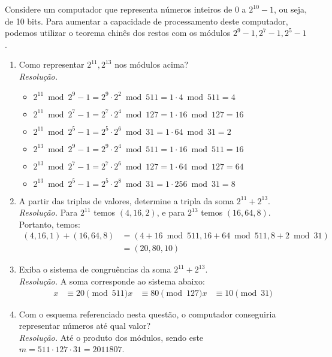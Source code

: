 Considere um computador que representa números inteiros de 0 a $2^{10} - 1$, ou seja, de 10 bits. Para aumentar a capacidade de processamento deste computador, podemos utilizar o teorema chinês dos restos com os módulos $2^{9} - 1, 2^{7} - 1, 2^{5} - 1$.
\begin{enumerate}
	\item Como representar $2^{11}, 2^{13}$ nos módulos acima? \\ 
	\emph{Resolução.} 
	\begin{itemize}
		\item $2^{11} \bmod{2^9 - 1} = 2^9 \cdot 2^2 \bmod{511} = 1 \cdot 4 \bmod{511} = 4$
		\item $2^{11}\bmod{2^7 - 1} = 2^7 \cdot 2^4 \bmod{127} = 1 \cdot 16 \bmod{127} = 16$
		\item $2^{11} \bmod{2^5 - 1} = 2^5 \cdot 2^6 \bmod{31} = 1 \cdot 64 \bmod{31} = 2$
		\item $2^{13} \bmod{2^9 - 1} = 2^9 \cdot 2^4 \bmod{511} = 1 \cdot 16 \bmod{511} = 16$
		\item $2^{13} \bmod{2^7 - 1} = 2^7 \cdot 2^6 \bmod{127} = 1 \cdot 64 \bmod{127} = 64$
		\item $2^{13} \bmod{2^5 - 1} = 2^5 \cdot 2^8 \bmod{31} = 1 \cdot 256 \bmod{31} = 8$
	\end{itemize}
	\item A partir das triplas de valores, determine a tripla da soma $2^{11} + 2^{13}$. \\ 
	\emph{Resolução.} Para $2^{11}$ temos $(4, 16, 2)$, e para $2^{13}$ temos $(16, 64, 8)$. Portanto, temos:
	\begin{align*}
		(4, 16, 1) + (16, 64, 8) &= (4 + 16 \bmod{511}, 16 + 64 \bmod{511}, 8 + 2 \bmod{31}) 
					\\ &= (20, 80, 10)
	\end{align*}
	\item Exiba o sistema de congruências da soma $2^{11} + 2^{13}$. \\
	\emph{Resolução.} A soma corresponde ao sistema abaixo:
	\begin{align*}
		x &\equiv 20 \pmod{511}
		x &\equiv 80 \pmod{127}
		x &\equiv 10 \pmod{31}
	\end{align*}
	\item Com o esquema referenciado nesta questão, o computador conseguiria representar números até qual valor? \\
	\emph{Resolução.} Até o produto dos módulos, sendo este $m = 511 \cdot 127 \cdot 31 = 2011807$.
\end{enumerate}
